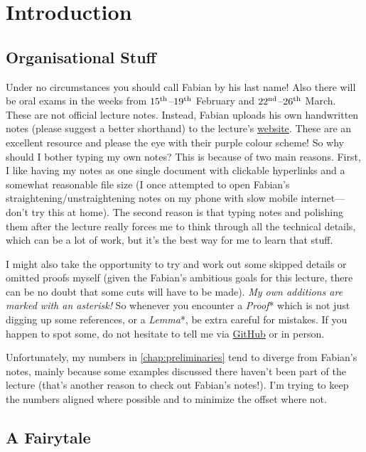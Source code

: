 \chapter{Introduction}
	\section{Organisational Stuff}
	Under no circumstances you should call Fabian by his last name! Also there will be oral exams in the weeks from $15^{\text{th}}$--$19^{\text{th}}$ February and $22^{\text{nd}}$--$26^{\text{th}}$ March.
	These are not official lecture notes. Instead, Fabian uploads his own handwritten notes \cite{KTheory} (please suggest a better shorthand) to the lecture's \href{https://www.math.uni-bonn.de/people/fhebestr/Ktheory/}{website}. These are an excellent resource and please the eye with their purple colour scheme! So why should I bother typing my own notes? This is because of two main reasons. First, I like having my notes as one single document with clickable hyperlinks and a somewhat reasonable file size (I once attempted to open Fabian's straightening/unstraightening notes on my phone with slow mobile internet---don't try this at home).  The second reason is that typing notes and polishing them after the lecture really forces me to think through all the technical details, which can be a lot of work, but it's the best way for me to learn that stuff.
	
	I might also take the opportunity to try and work out some skipped details or omitted proofs myself (given the Fabian's ambitious goals for this lecture, there can be no doubt that some cuts will have to be made). \emph{My own additions are marked with an asterisk!} So whenever you encounter a \emph{Proof}* which is not just digging up some references, or a \emph{Lemma}*, be extra careful for mistakes. If you happen to spot some, do not hesitate to tell me via \href{https://github.com/FlorianAdler/AlgebraBonn/issues/new}{GitHub} or in person.
	
	Unfortunately, my numbers in \cref{chap:preliminaries} tend to diverge from Fabian's notes, mainly because some examples discussed there haven't been part of the lecture (that's another reason to check out Fabian's notes!). I'm trying to keep the numbers aligned where possible and to minimize the offset where not.
	
	
	\section{A Fairytale}

